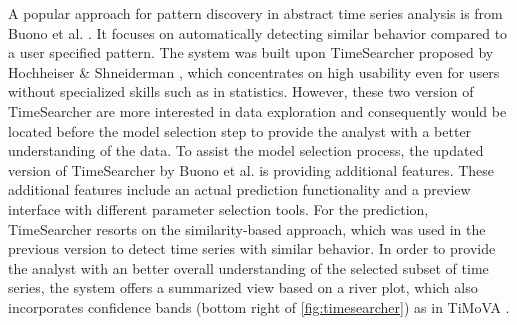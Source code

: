 \documentclass[electronic]{vgtc}             %
\begin{document}
A popular approach for pattern discovery in abstract time series analysis is from Buono et al. \cite{buono:2005}.
It focuses on automatically detecting similar behavior compared to a user specified pattern.
The system was built upon TimeSearcher proposed by Hochheiser \& Shneiderman \cite{Hochheiser:2004}, which concentrates on high usability even for users without specialized skills such as in statistics.
However, these two version of TimeSearcher are more interested in data exploration and consequently would be located before the model selection step to provide the analyst with a better understanding of the data. 
To assist the model selection process, the updated version of TimeSearcher by Buono et al. \cite{buono:2007} is providing additional features.  
These additional features include an actual prediction functionality and a preview interface with different parameter selection tools.
For the prediction, TimeSearcher resorts on the similarity-based approach, which was used in the previous version \cite{buono:2005, Hochheiser:2004} to detect time series with similar behavior.
In order to provide the analyst with an better overall understanding of the selected subset of time series, the system offers a summarized view based on a river plot, which also incorporates confidence bands (bottom right of \autoref{fig:timesearcher}) as in TiMoVA \cite{boegl:2013, boegl:2014}.
\end{document}
